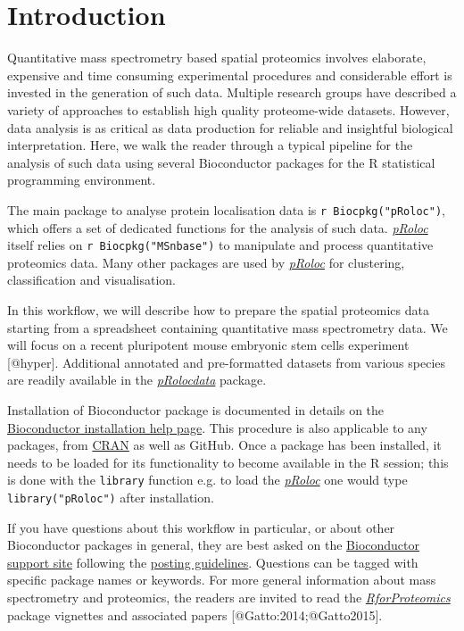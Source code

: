 \section{Introduction}\label{introduction}

Quantitative mass spectrometry based spatial proteomics involves
elaborate, expensive and time consuming experimental procedures and
considerable effort is invested in the generation of such data. Multiple
research groups have described a variety of approaches to establish high
quality proteome-wide datasets. However, data analysis is as critical as
data production for reliable and insightful biological interpretation.
Here, we walk the reader through a typical pipeline for the analysis of
such data using several Bioconductor packages for the R statistical
programming environment.

The main package to analyse protein localisation data is
\texttt{r Biocpkg("pRoloc")}, which offers a set of dedicated functions
for the analysis of such data.
\emph{\href{http://bioconductor.org/packages/pRoloc}{pRoloc}} itself
relies on \texttt{r Biocpkg("MSnbase")} to manipulate and process
quantitative proteomics data. Many other packages are used by
\emph{\href{http://bioconductor.org/packages/pRoloc}{pRoloc}} for
clustering, classification and visualisation.

In this workflow, we will describe how to prepare the spatial proteomics
data starting from a spreadsheet containing quantitative mass
spectrometry data. We will focus on a recent pluripotent mouse embryonic
stem cells experiment {[}@hyper{]}. Additional annotated and
pre-formatted datasets from various species are readily available in the
\emph{\href{http://bioconductor.org/packages/pRolocdata}{pRolocdata}}
package.

Installation of Bioconductor package is documented in details on the
\href{http://bioconductor.org/install/\#install-bioconductor-packages}{Bioconductor
installation help page}. This procedure is also applicable to any
packages, from \href{https://cran.r-project.org/}{CRAN} as well as
GitHub. Once a package has been installed, it needs to be loaded for its
functionality to become available in the R session; this is done with
the \texttt{library} function e.g. to load the
\emph{\href{http://bioconductor.org/packages/pRoloc}{pRoloc}} one would
type \texttt{library("pRoloc")} after installation.

If you have questions about this workflow in particular, or about other
Bioconductor packages in general, they are best asked on the
\href{https://support.bioconductor.org/}{Bioconductor support site}
following the
\href{http://www.bioconductor.org/help/support/posting-guide/}{posting
guidelines}. Questions can be tagged with specific package names or
keywords. For more general information about mass spectrometry and
proteomics, the readers are invited to read the
\emph{\href{http://bioconductor.org/packages/RforProteomics}{RforProteomics}}
package vignettes and associated papers {[}@Gatto:2014;@Gatto2015{]}.

